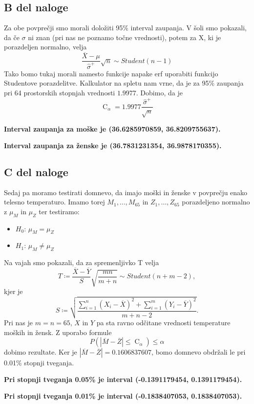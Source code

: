 \documentclass{article}
\DeclareMathOperator{\CM}{C}
\begin{document}
    \subsection{B del naloge}
    Za obe povprečji smo morali doložiti 95\% interval zaupanja. V šoli smo pokazali, da če $\sigma$ ni znan (pri nas ne poznamo točne vrednosti), potem za X, ki je
    porazdeljen normalno, velja
    \[
        \frac{\overline{X} - \mu}{\widehat{\sigma}^{+}} \sqrt{n} \sim Student(n - 1)
    \]
    Tako bomo tukaj morali namesto funkcije napake erf uporabiti funkcijo Studentove porazdelitve. Kalkulator na spletu nam vrne, da je za 95\% zaupanja pri 64 prostorskih stopnjah
    vrednosti $1.9977$. Dobimo, da je 
    \[
        \CM_{\alpha} = 1.9977\frac{\widehat{\sigma}^{+}}{\sqrt{n}}
    \]
    \par \textbf{Interval zaupanja za moške je (36.6285970859, 36.8209755637).}
    \par \textbf{Interval zaupanja za ženske je (36.7831231354, 36.9878170355).}

    \subsection{C del naloge}
    Sedaj pa moramo testirati domnevo, da imajo moški in ženske v povprečju enako telesno temperaturo. Imamo torej $M_{1}, \ldots, M_{65}$ in $Z_{1}, \ldots, Z_{65}$ porazdeljeno
    normalno z $\mu_{M}$ in $\mu_{Z}$ ter testiramo:
    \begin{itemize}
        \item $H_{0}$: $\mu_{M} = \mu_{Z}$
        \item $H_{1}$: $\mu_{M} \neq \mu_{Z}$
    \end{itemize}
    Na vajah smo pokazali, da za spremenljivko T velja
    \[
        T \coloneqq \frac{\overline{X} - \overline{Y}}{S}\sqrt{\frac{mn}{m + n}} \sim Student(n + m - 2),
    \]
    kjer je
    \[
        S \coloneqq \sqrt{\frac{\sum_{i = 1}^n (X_{i} - \overline{X})^2 + \sum_{i = 1}^m (Y_{i} - \overline{Y})^2}{m + n - 2}}.
    \]
    Pri nas je $m = n = 65$, $X$ in $Y$ pa sta ravno odčitane vrednosti temperature moških in žensk. Z uporabo formule
    \[
        P(|\overline{M} - \overline{Z}| \leq \CM_{\alpha}) \leq \alpha 
    \]
    dobimo rezultate. Ker je $|\overline{M} - \overline{Z}| = 0.1606837607$, bomo domnevo obdržali le pri 0.01\% stopnji tveganja.
    \par \textbf{Pri stopnji tveganja 0.05\% je interval (-0.1391179454, 0.1391179454).}
    \par \textbf{Pri stopnji tveganja 0.01\% je interval (-0.1838407053, 0.1838407053).}
\end{document}
